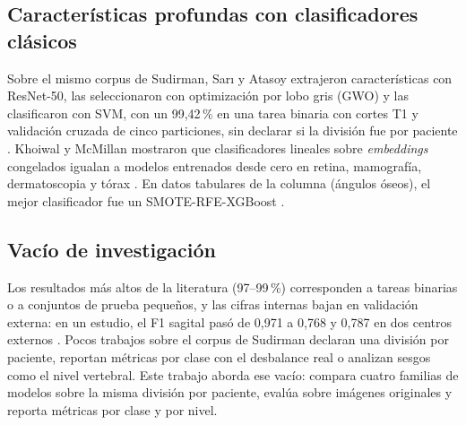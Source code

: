 \subsection{Características profundas con clasificadores clásicos}
Sobre el mismo corpus de Sudirman, Sarı y Atasoy extrajeron características con ResNet-50, las seleccionaron con optimización por lobo gris (GWO) y las clasificaron con SVM, con un 99,42\,\% en una tarea binaria con cortes T1 y validación cruzada de cinco particiones, sin declarar si la división fue por paciente \cite{sari2025}. Khoiwal y McMillan mostraron que clasificadores lineales sobre \emph{embeddings} congelados igualan a modelos entrenados desde cero en retina, mamografía, dermatoscopia y tórax \cite{khoiwal2024}. En datos tabulares de la columna (ángulos óseos), el mejor clasificador fue un SMOTE-RFE-XGBoost \cite{zhang2023}.

\subsection{Vacío de investigación}
Los resultados más altos de la literatura (97--99\,\%) corresponden a tareas binarias o a conjuntos de prueba pequeños, y las cifras internas bajan en validación externa: en un estudio, el F1 sagital pasó de 0,971 a 0,768 y 0,787 en dos centros externos \cite{yi2023}. Pocos trabajos sobre el corpus de Sudirman declaran una división por paciente, reportan métricas por clase con el desbalance real o analizan sesgos como el nivel vertebral. Este trabajo aborda ese vacío: compara cuatro familias de modelos sobre la misma división por paciente, evalúa sobre imágenes originales y reporta métricas por clase y por nivel.

